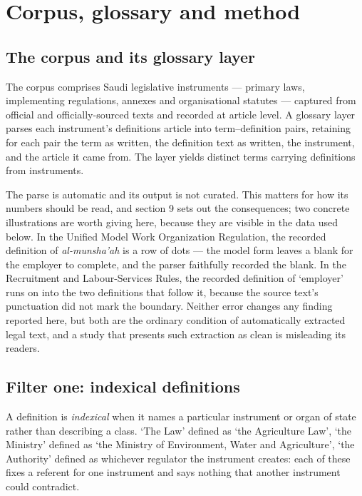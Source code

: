 \documentclass[11pt]{article}
\begin{document}
\section{Corpus, glossary and method}

\subsection{The corpus and its glossary layer}
\label{sec:corpus}

The corpus comprises \nInstruments{} Saudi legislative instruments --- primary laws,
implementing regulations, annexes and organisational statutes --- captured
from official and officially-sourced texts and recorded at article level. A
glossary layer parses each instrument's definitions article into
term--definition pairs, retaining for each pair the term as written, the
definition text as written, the instrument, and the article it came from. The
layer yields \nTerms{} distinct terms carrying \nDefinitions{} definitions from \nWithDefsArticle{}
instruments.

The parse is automatic and its output is not curated. This matters for how
its numbers should be read, and section 9 sets out the consequences; two
concrete illustrations are worth giving here, because they are visible in the
data used below. In the Unified Model Work Organization Regulation, the
recorded definition of \emph{al-munsha'ah} is a row of dots --- the model
form leaves a blank for the employer to complete, and the parser faithfully
recorded the blank. In the Recruitment and Labour-Services Rules, the
recorded definition of `employer' runs on into the two definitions that
follow it, because the source text's punctuation did not mark the boundary.
Neither error changes any finding reported here, but both are the ordinary
condition of automatically extracted legal text, and a study that presents
such extraction as clean is misleading its readers.

\subsection{Filter one: indexical definitions}

A definition is \emph{indexical} when it names a particular instrument or
organ of state rather than describing a class. `The Law' defined as `the
Agriculture Law', `the Ministry' defined as `the Ministry of Environment,
Water and Agriculture', `the Authority' defined as whichever regulator the
instrument creates: each of these fixes a referent for one instrument and
says nothing that another instrument could contradict.
\end{document}
